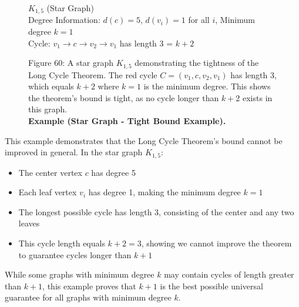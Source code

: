 \documentclass{article}
\theoremstyle{definition}
\begin{document}
\begin{figure}[h]
\centering
{}

\begin{center}
\small
$K_{1,5}$ (Star Graph)\\
Degree Information: $d(c) = 5$, $d(v_i) = 1$ for all $i$, Minimum degree $k = 1$\\
Cycle: $v_1 \xrightarrow{} c \xrightarrow{} v_2 \xrightarrow{} v_1$ has length 3 = $k+2$
\end{center}

\begin{center}
\small
Figure 60: A star graph $K_{1,5}$ demonstrating the tightness of the Long Cycle Theorem. 
The red cycle $C = (v_1, c, v_2, v_1)$ has length 3, which equals $k+2$ where $k=1$ is 
the minimum degree. This shows the theorem's bound is tight, as no cycle longer than 
$k+2$ exists in this graph.\\
\textbf{Example (Star Graph - Tight Bound Example).}
\end{center}
\end{figure}

This example demonstrates that the Long Cycle Theorem's bound cannot be improved in general. In the star graph $K_{1,5}$:
\begin{itemize}
    \item The center vertex $c$ has degree 5
    \item Each leaf vertex $v_i$ has degree 1, making the minimum degree $k=1$
    \item The longest possible cycle has length 3, consisting of the center and any two leaves
    \item This cycle length equals $k+2=3$, showing we cannot improve the theorem to guarantee cycles longer than $k+1$
\end{itemize}
While some graphs with minimum degree $k$ may contain cycles of length greater than $k+1$, this example proves that $k+1$ is the best possible universal guarantee for all graphs with minimum degree $k$.
\end{document}
